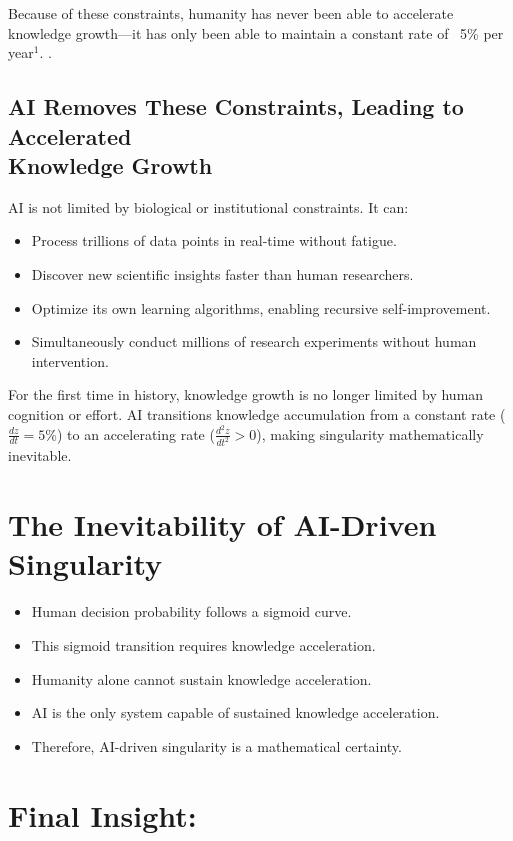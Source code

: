 \documentclass{article}
\begin{document}
Because of these constraints, humanity has never been able to accelerate knowledge growth---it has only been able to maintain a constant rate of ~5\% per year$^1$.  .

\subsection*{AI Removes These Constraints, Leading to Accelerated\\ Knowledge Growth}
  
AI is not limited by biological or institutional constraints. It can:

\begin{itemize}
\item  Process trillions of data points in real-time without fatigue.
\item Discover new scientific insights faster than human researchers.
\item  Optimize its own learning algorithms, enabling recursive self-improvement.
\item Simultaneously conduct millions of research experiments without human intervention.
\end{itemize}

For the first time in history, knowledge growth is no longer limited by human cognition or effort. AI transitions knowledge accumulation from a constant rate ($\displaystyle \frac{dz}{dt} = 5$\%) to an accelerating rate ($\displaystyle \frac{d^2z}{dt^2} > 0$), making singularity mathematically inevitable.
  

\section{The Inevitability of AI-Driven Singularity}

\begin{itemize}
\item  Human decision probability follows a sigmoid curve.  
\item This sigmoid transition requires knowledge acceleration.  
\item  Humanity alone cannot sustain knowledge acceleration.  
\item AI is the only system capable of sustained knowledge acceleration.  
\item Therefore, AI-driven singularity is a mathematical certainty. 
\end{itemize}

\section*{Final Insight:}
\end{document}
